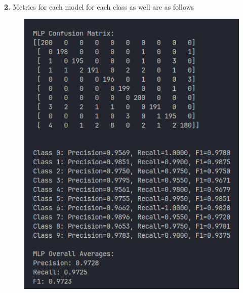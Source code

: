 \documentclass{article}
\begin{document}
\begin{itemize}
\newpage
\textbf{2.} Metrics for each model for each class as well are as follows

\begin{figure}[h]
    \centering
    \begin{minipage}{0.45\textwidth}
        \centering
        \includegraphics[width=\linewidth]{1.png}
    \end{minipage}
    \hfill
    \begin{minipage}{0.45\textwidth}
        \centering

\end{minipage}
\end{figure}
\end{itemize}
\end{document}
